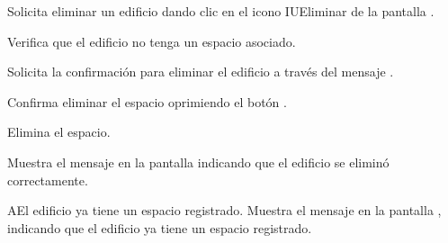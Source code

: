 \begin{UCtrayectoria}
	\UCpaso [\UCactor] Solicita eliminar un edificio dando clic en el icono IUEliminar de la pantalla .
	
	\UCpaso [\UCsist] Verifica que el edificio no tenga un espacio asociado. 
	
	\UCpaso [\UCsist] Solicita la confirmación para eliminar el edificio a través del mensaje .
	
	\UCpaso [\UCactor] Confirma eliminar el espacio oprimiendo el botón .
	
	\UCpaso [\UCsist] Elimina el espacio.
	
	\UCpaso [\UCsist] Muestra el mensaje  en la pantalla  indicando que el edificio se eliminó correctamente.	
	
\end{UCtrayectoria}

\begin{UCtrayectoriaA}{A}{El edificio ya tiene un espacio registrado.}
	\UCpaso [\UCsist] Muestra el mensaje  en la pantalla , indicando que el edificio ya tiene un espacio registrado. 
\end{UCtrayectoriaA}
